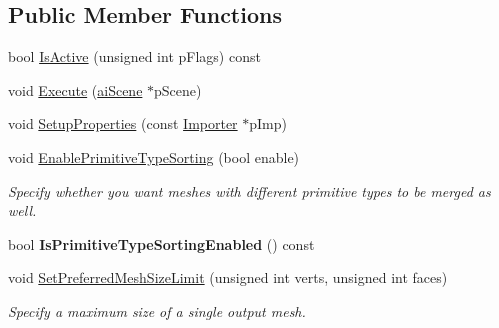 \subsection*{Public Member Functions}
\begin{DoxyCompactItemize}
\item 
bool \hyperlink{class_assimp_1_1_optimize_meshes_process_ad2564bdd293ac53f781883c044610649}{Is\+Active} (unsigned int p\+Flags) const 
\item 
void \hyperlink{class_assimp_1_1_optimize_meshes_process_a43232ef13ca41e15bfa237f1f6f19978}{Execute} (\hyperlink{structai_scene}{ai\+Scene} $\ast$p\+Scene)
\item 
void \hyperlink{class_assimp_1_1_optimize_meshes_process_a21115c3af0abe17142d32ead4204b451}{Setup\+Properties} (const \hyperlink{class_assimp_1_1_importer}{Importer} $\ast$p\+Imp)
\item 
void \hyperlink{class_assimp_1_1_optimize_meshes_process_a96f593b6215808421204689f3c6db679}{Enable\+Primitive\+Type\+Sorting} (bool enable)
\begin{DoxyCompactList}\small\item\em Specify whether you want meshes with different primitive types to be merged as well. \end{DoxyCompactList}\item 
\hypertarget{class_assimp_1_1_optimize_meshes_process_a92be986cb23c8e82d570d95cbe90648b}{bool {\bfseries Is\+Primitive\+Type\+Sorting\+Enabled} () const }\label{class_assimp_1_1_optimize_meshes_process_a92be986cb23c8e82d570d95cbe90648b}

\item 
void \hyperlink{class_assimp_1_1_optimize_meshes_process_ae671bfa9bf6fe31602044836a0031f73}{Set\+Preferred\+Mesh\+Size\+Limit} (unsigned int verts, unsigned int faces)
\begin{DoxyCompactList}\small\item\em Specify a maximum size of a single output mesh. \end{DoxyCompactList}\end{DoxyCompactItemize}
